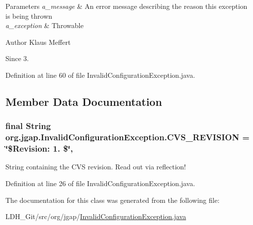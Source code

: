 \begin{DoxyParams}{Parameters}
{\em a\-\_\-message} & An error message describing the reason this exception is being thrown \\
\hline
{\em a\-\_\-exception} & Throwable\\
\hline
\end{DoxyParams}
\begin{DoxyAuthor}{Author}
Klaus Meffert 
\end{DoxyAuthor}
\begin{DoxySince}{Since}
3. 
\end{DoxySince}


Definition at line 60 of file Invalid\-Configuration\-Exception.\-java.



\subsection{Member Data Documentation}
\hypertarget{classorg_1_1jgap_1_1_invalid_configuration_exception_ac2b20ece5c19cc10c6387dc24ce5f6bd}{
\subsubsection[{C\-V\-S\-\_\-\-R\-E\-V\-I\-S\-I\-O\-N}]{\setlength{\rightskip}{0pt plus 5cm}final String org.\-jgap.\-Invalid\-Configuration\-Exception.\-C\-V\-S\-\_\-\-R\-E\-V\-I\-S\-I\-O\-N = \char`\"{}\$Revision\-: 1. \$\char`\"{}\hspace{0.3cm}{\ttfamily [static]}, {\ttfamily [private]}}}\label{classorg_1_1jgap_1_1_invalid_configuration_exception_ac2b20ece5c19cc10c6387dc24ce5f6bd}
String containing the C\-V\-S revision. Read out via reflection! 

Definition at line 26 of file Invalid\-Configuration\-Exception.\-java.



The documentation for this class was generated from the following file\-:\begin{DoxyCompactItemize}
\item 
L\-D\-H\-\_\-\-Git/src/org/jgap/\hyperlink{_invalid_configuration_exception_8java}{Invalid\-Configuration\-Exception.\-java}\end{DoxyCompactItemize}
